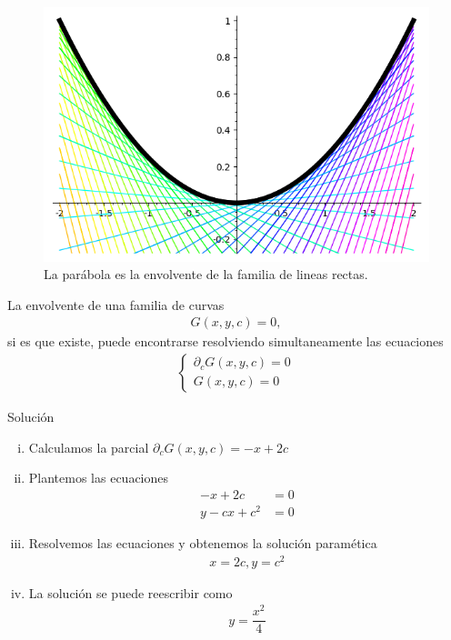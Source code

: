 \begin{figure}
	\centering
	\includegraphics[width=.7\textheight,keepaspectratio=true]{./edo/solved_problem_02-05.png}
	\caption{La parábola es la envolvente de la familia de lineas rectas. }
	\label{fig:solved_problem_02-05}
\end{figure}



La envolvente de una familia de curvas
\begin{align*}
	G(x,y,c)=0,
\end{align*}
si es que existe, puede encontrarse resolviendo simultaneamente las ecuaciones
\begin{align*}
	\begin{cases}
		\partial_{c}G(x,y,c) = 0\\
		G(x,y,c) = 0
	\end{cases}
\end{align*}


{Solución}
\begin{enumerate}[(i)]
	\item Calculamos la parcial $
	\partial_{c}G(x,y,c) =-x+2c$

	\item Plantemos las ecuaciones
	\begin{align*}
		-x+2c&=0\\
		y-cx+c^2&=0
	\end{align*}

	\item Resolvemos las ecuaciones y obtenemos la solución paramética
	\begin{align*}
		x=2c, y =c^{2}
	\end{align*}

	\item La solución se puede reescribir como
	\begin{align*}
		y = \dfrac{x^2}{4}
	\end{align*}
\end{enumerate}

